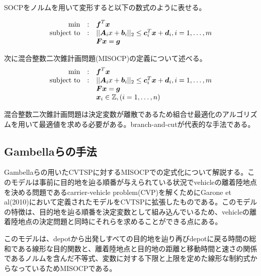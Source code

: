 \documentclass[11pt,a4paper,dvipdfmx,titlepage,uplatex]{jsarticle}
\theoremstyle{mystyle}
\newcommand{\0}{\mathbf{0}}
\def\b{\mbox{\boldmath $b$}}
\def\c{\mbox{\boldmath $c$}}
\def\d{\mbox{\boldmath $d$}}
\def\f{\mbox{\boldmath $f$}}
\def\g{\mbox{\boldmath $g$}}
\def\x{\mbox{\boldmath $x$}}
\def\A{\mbox{\boldmath $A$}}
\def\F{\mbox{\boldmath $F$}}
\begin{document}
	SOCPをノルムを用いて変形すると以下の数式のように表せる。
	
	\begin{align}
		\begin{array}{rcl}
			\min & : & \f ^T\x \\
			\text{subject to} & : &||\A_i x +\b_i||_2 \leq \c_i^T\x+\d_i, i = 1,\dots, m \\
			& & \F\x=\g\\
		\end{array}
	\end{align}
	
	
	次に混合整数二次錐計画問題(MISOCP)の定義について述べる。
	\begin{align}
		\begin{array}{rcl}
			\min & : & \f ^T\x \\
			\text{subject to} & : &||\A_i x +\b_i||_2 \leq \c_i^T\x+\d_i, i = 1,\dots, m \\
			& & \F\x=\g\\
			& & \x_i \in \mathbb{Z}, (i=1,\dots, n)
		\end{array}
	\end{align}
	
	
	混合整数二次錐計画問題は決定変数が離散であるため組合せ最適化のアルゴリズムを用いて最適値を求める必要がある。branch-and-cut\cite{drewes2009mixed}が代表的な手法である。
	\subsection{Gambellaらの手法}\label{sec:gambella}
	
	Gambellaらの用いたCVTSPに対するMISOCPでの定式化について解説する。このモデルは事前に目的地を辿る順番が与えられている状況でvehicleの離着陸地点を決める問題であるcarrier-vehicle problem(CVP)を解くためにGarone et al(2010)\cite{garone2010planning}において定義されたモデルをCVTSPに拡張したものである。このモデルの特徴は、目的地を辿る順番を決定変数として組み込んでいるため、vehicleの離着陸地点の決定問題と同時にそれらを求めることができる点にある。
	
	このモデルは、depotから出発しすべての目的地を辿り再びdepotに戻る時間の総和である線形な目的関数と、離着陸地点と目的地の距離と移動時間と速さの関係であるノルムを含んだ不等式、変数に対する下限と上限を定めた線形な制約式からなっているためMISOCPである。
	
\end{document}
